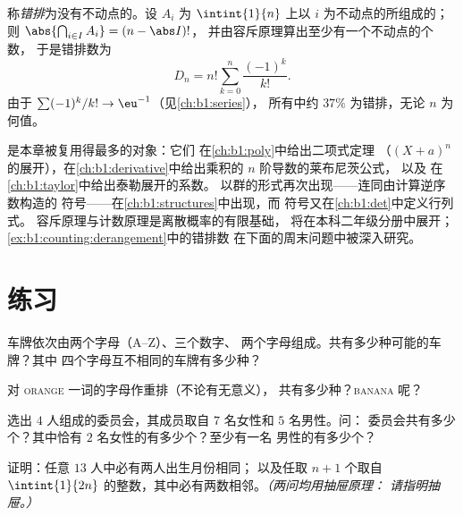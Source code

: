 \begin{example}[错排]\label{ex:b1:counting:derangement}
称\emph{错排}为没有不动点的。设 $A_i$
为 $\intint{1}{n}$ 上以 $i$ 为不动点的所组成的；
则 $\abs{\bigcap_{i \in I} A_i} = (n - \abs I)!$，
并由容斥原理算出至少有一个不动点的个数，
于是错排数为
\[
D_n = n! \sum_{k=0}^{n} \frac{(-1)^k}{k!} .
\]
由于 $\sum (-1)^k / k! \to \eu^{-1}$（见\cref{ch:b1:series}），
所有中约 $37\%$ 为错排，无论 $n$ 为何值。
\end{example}

\begin{remark}[本章的应用]\label{rem:b1:counting:whereused}
是本章被复用得最多的对象：它们
在\cref{ch:b1:poly}中给出二项式定理
（$(X + a)^n$ 的展开），在\cref{ch:b1:derivative}中给出乘积的 $n$ 阶导数的莱布尼茨公式，
以及
在\cref{ch:b1:taylor}中给出泰勒展开的系数。
以群的形式再次出现——连同由计算逆序数构造的
符号——在\cref{ch:b1:structures}中出现，而
符号又在\cref{ch:b1:det}中定义行列式。
容斥原理与计数原理是离散概率的有限基础，
将在本科二年级分册中展开；
\cref{ex:b1:counting:derangement}中的错排数
在下面的周末问题中被深入研究。
\end{remark}

\section{练习}

\begin{exercise}[$\star$]\label{exo:b1:counting:1}
车牌依次由两个字母（A--Z）、三个数字、
两个字母组成。共有多少种可能的车牌？其中
四个字母互不相同的车牌有多少种？
\end{exercise}

\begin{exercise}[$\star$]\label{exo:b1:counting:2}
对 \textsc{orange} 一词的字母作重排（不论有无意义），
共有多少种？\textsc{banana} 呢？
\end{exercise}

\begin{exercise}[$\star$]\label{exo:b1:counting:3}
选出 $4$ 人组成的委员会，其成员取自 $7$ 名女性和 $5$ 名男性。问：
委员会共有多少个？其中恰有 $2$ 名女性的有多少个？至少有一名
男性的有多少个？
\end{exercise}

\begin{exercise}[$\star$]\label{exo:b1:counting:4}
证明：任意 $13$ 人中必有两人出生月份相同；
以及任取 $n + 1$ 个取自 $\intint{1}{2n}$ 的整数，其中必有两数相邻。\emph{（两问均用抽屉原理：
请指明抽屉。）}
\end{exercise}

